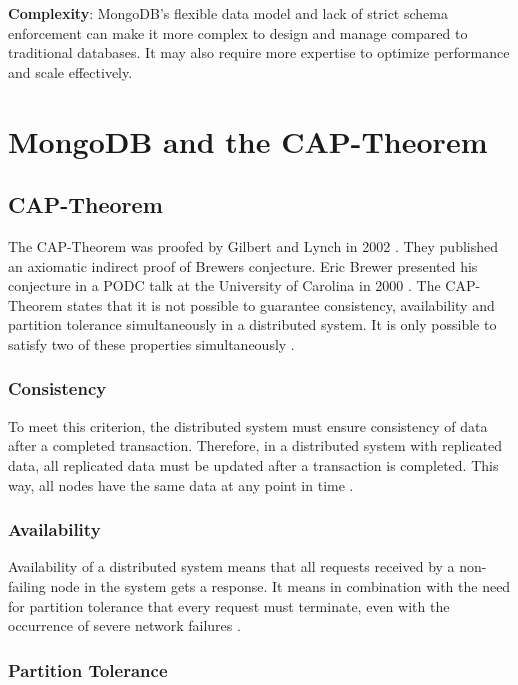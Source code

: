 \textbf{Complexity}: MongoDB's flexible data model and lack of strict schema enforcement can make it more complex to design and manage compared to traditional databases. It may also require more expertise to optimize performance and scale effectively.

\section{MongoDB and the CAP-Theorem}

\subsection{CAP-Theorem}

The \ac{CAP}-Theorem was proofed by Gilbert and Lynch in 2002 \parencite{brewer:2002}. They published an axiomatic indirect proof of Brewers conjecture. Eric Brewer presented his conjecture in a \ac{PODC} talk at the University of Carolina in 2000 \parencite{brewer:2000}. The \ac{CAP}-Theorem states that it is not possible to guarantee consistency, availability and partition tolerance simultaneously in a distributed system. It is only possible to satisfy two of these properties simultaneously \parencite[1]{brewer:2002}.

\subsubsection*{Consistency}

To meet this criterion, the distributed system must ensure consistency of data after a completed transaction. Therefore, in a distributed system with replicated data, all replicated data must be updated after a transaction is completed. This way, all nodes have the same data at any point in time \parencite[2\psqq]{brewer:2002}.

\subsubsection*{Availability}

Availability of a distributed system means that all requests received by a non-failing node in the system gets a response. It means in combination with the need for partition tolerance that every request must terminate, even with the occurrence of severe network failures \parencite[3]{brewer:2002}.

\subsubsection*{Partition Tolerance}

